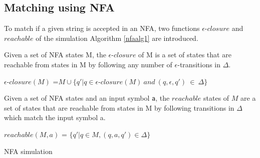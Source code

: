 \subsection{Matching using NFA}
To match if a given string is accepted in an NFA, two functions $\epsilon$-$closure$ and $reachable$ of the simulation Algorithm \ref{nfaalg1} are introduced.
\begin{mydef}
Given a set of NFA states M, the $\epsilon $-$ closure$ of M is a set of states that are reachable from states in M by following any number of $\epsilon$-transitions in $\Delta$.
\begin{center}
$\epsilon$-$closure(M)$ =$ M \cup \{q'|q\in \epsilon$-$closure(M) ~and ~(q,\epsilon,q') ~ \in ~ \Delta\}$
\end{center}
\cite[p. 34, def 2.2]{compile}
\end{mydef}

\begin{mydef}
Given a set of NFA states and an input symbol {\tt a}, the $reachable$ states of $M$ are a set of states that are reachable from states in M by following transitions in $\Delta$ which match the input symbol a. 
\begin{center}
$reachable(M,a)$ = $\{q'|q \in M,(q,a,q')\in \Delta \}$
\end{center}
\end{mydef}
\begin{algorithm}
  \caption{NFA simulation}
    \label{nfaalg1}
  \begin{algorithmic}[1]
            \State {}
        \EndIf
      \EndFor
        \State {}
      \EndIf
      \State {}
    \EndFunction
  \end{algorithmic}
\end{algorithm}

